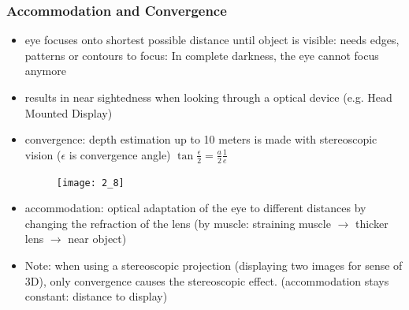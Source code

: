 \documentclass{standalone}
\begin{document}
\subsubsection{Accommodation and Convergence}
\begin{itemize}
	\item eye focuses onto shortest possible distance until object is visible: needs edges, patterns or contours to focus: In complete darkness, the eye cannot focus anymore
	\item results in near sightedness when looking through a optical device (e.g. Head Mounted Display)
	\item convergence: depth estimation up to 10 meters is made with stereoscopic vision ($\epsilon$ is convergence angle) $\tan \frac{\epsilon}{2} = \frac{a}{2} \frac{1}{e}$
	
	\begin{figure}[H]
		\texttt{[image: 2\_8]}
	\end{figure}
	
	\item accommodation: optical adaptation of the eye to different distances by changing the refraction of the lens (by muscle: straining muscle $\rightarrow$ thicker lens $\rightarrow$ near object)
	\item Note: when using a stereoscopic projection (displaying two images for sense of 3D), only convergence causes the stereoscopic effect. (accommodation stays constant: distance to display)
\end{itemize}


\setcounter{subsubsection}{4}
\end{document}
